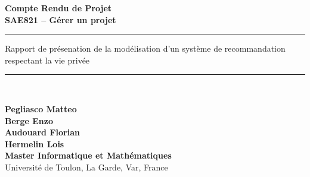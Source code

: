 \documentclass{article}
\date{\vspace{1cm} \today}
\newcommand{\HRule}{\rule{\linewidth}{0.5mm}}
\begin{document}
\begin{titlepage}
    \centering

    \vspace*{2cm}

    {\Huge\bfseries Compte Rendu de Projet\\[0.5em] \LARGE SAE821 -- Gérer un projet}

    \vspace{1.5cm}

    \HRule
    \vspace{1cm}

    \Large{Rapport de présenation de la modélisation d'un système de recommandation  respectant la vie privée}\\[0.5em]

    \vspace{1cm}
    \HRule\\[11cm]
    \begin{flushleft}
        \small
        \textbf{Pegliasco Matteo}\\
        \textbf{Berge Enzo}\\
        \textbf{Audouard Florian}\\
        \textbf{Hermelin Lois}\\
        \textbf{Master Informatique et Mathématiques}\\
        Université de Toulon, La Garde, Var, France
    \end{flushleft}
    \vfill

\end{titlepage}
\end{document}
